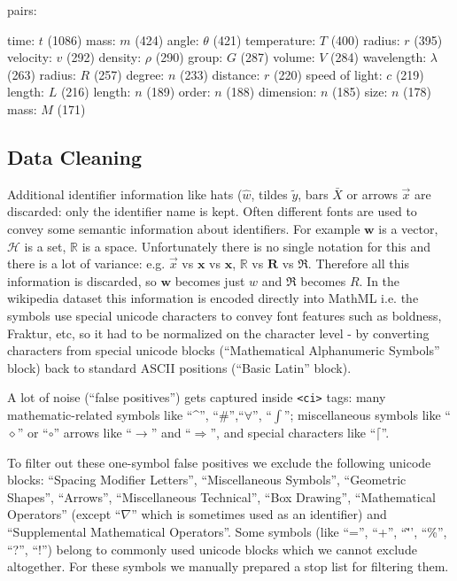 pairs:


time: $t$ (1086)
mass: $m$ (424)
angle: $\theta$ (421)
temperature: $T$ (400)
radius: $r$ (395)
velocity: $v$ (292)
density: $\rho$ (290)
group: $G$ (287)
volume: $V$ (284)
wavelength: $\lambda$ (263)
radius: $R$ (257)
degree: $n$ (233)
distance: $r$ (220)
speed of light: $c$ (219)
length: $L$ (216)
length: $n$ (189)
order: $n$ (188)
dimension: $n$ (185)
size: $n$ (178)
mass: $M$ (171)


\subsection{Data Cleaning}


Additional identifier
information like hats ($\hat w$, tildes $\tilde y$, bars $\bar X$ or arrows $\overrightarrow x$
are discarded: only the identifier name is kept.
Often different fonts are used to convey some semantic information about identifiers.
For example $\mathbf w$ is a vector, $\mathcal H$ is a set, $\mathbb R$ is a space.
Unfortunately there is no single notation for this and there is a lot of variance:
e.g. $\overrightarrow x$ vs $\boldsymbol x$ vs $\mathbf x$, $\mathbb R$ vs $\mathbf R$ vs $\mathfrak R$.
Therefore all this information is discarded, so $\mathbf w$ becomes just $w$
and $\mathfrak R$ becomes $R$.
In the wikipedia dataset this information is encoded directly into MathML
i.e. the symbols use special unicode characters to convey font features such as 
boldness, Fraktur, etc,
so it had to be normalized on the character level - by converting characters
from special unicode blocks (``Mathematical Alphanumeric Symbols'' block)
back to standard ASCII positions (``Basic Latin'' block).

A lot of noise (``false positives'')
gets captured inside \verb|<ci>| tags: many mathematic-related symbols
like ``\textasciicircum'', ``\#'',``$\forall$'', ``$\int$''; 
miscellaneous symbols like ``$\diamond$'' or
``$\circ$'' arrows like ``$\to$'' and ``$\Rightarrow$'', and special characters like
``$\lceil$''.

To filter out these one-symbol false positives we exclude the following unicode blocks:
``Spacing Modifier Letters'', ``Miscellaneous Symbols'', ``Geometric Shapes'', ``Arrows'',
``Miscellaneous Technical'', ``Box Drawing'', ``Mathematical Operators''
(except ``$\nabla$'' which is sometimes used as an identifier)
and ``Supplemental Mathematical Operators''.
Some symbols (like ``='', ``+'', ``\~'', ``\%'', ``?'', ``!'')
belong to commonly used unicode blocks 
which we cannot exclude altogether. For these symbols we manually 
prepared a stop list for filtering them.


